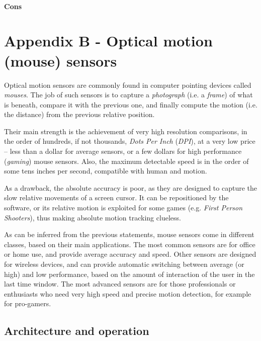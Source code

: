 \documentclass[a4paper,10pt]{article}
\begin{document}
\begin{multicols}{2}
\paragraph{Cons}
\TODO


\section{Appendix B - Optical motion (mouse) sensors}

Optical motion sensors are commonly found in computer pointing devices called
\emph{mouses}. The job of such sensors is to capture a \emph{photograph}
(i.e. a \emph{frame}) of what is beneath, compare it with the previous one,
and finally compute the motion (i.e. the distance) from the previous relative
position.

Their main strength is the achievement of very high resolution comparisons, in
the order of hundreds, if not thousands, \emph{Dots Per Inch} (\emph{DPI}), at
a very low price -- less than a dollar for average sensors, or a few dollars
for high performance (\emph{gaming}) mouse sensors. Also, the maximum
detectable speed is in the order of some tens inches per second, compatible
with human and motion.

As a drawback, the absolute accuracy is poor, as they are designed to capture
the slow relative movements of a screen cursor. It can be repositioned by
the software, or its relative motion is exploited for some games (e.g.
\emph{First Person Shooters}), thus making absolute motion tracking clueless.

As can be inferred from the previous statements, mouse sensors come in
different classes, based on their main applications. The most common sensors
are for office or home use, and provide average accuracy and speed. Other
sensors are designed for wireless devices, and can provide automatic switching
between average (or high) and low performance, based on the amount of
interaction of the user in the last time window. The most advanced sensors are
for those professionals or enthusiasts who need very high speed and precise
motion detection, for example for pro-gamers.


\subsection{Architecture and operation}


\end{multicols}
\end{document}
